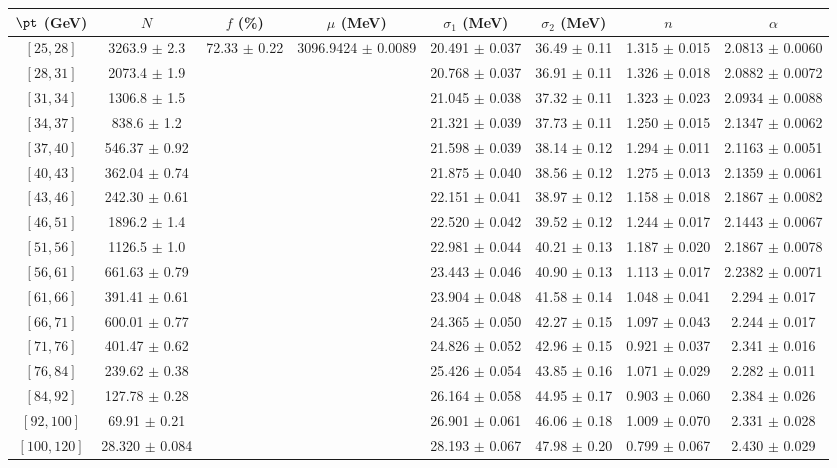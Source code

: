 \begin{tabular}{c||c|c|c|c|c|c|c}
$\pt$ (GeV) & $N$ & $f$ (\%) & $\mu$ (MeV) & $\sigma_1$ (MeV) & $\sigma_2$ (MeV) & $n$ & $\alpha$ \\
\hline
$[25, 28]$ & 3263.9 $\pm$ 2.3 & \multirow{17}{*}{72.33 $\pm$ 0.22} & \multirow{17}{*}{3096.9424 $\pm$ 0.0089} & 20.491 $\pm$ 0.037 & 36.49 $\pm$ 0.11 & 1.315 $\pm$ 0.015 & 2.0813 $\pm$ 0.0060\\
$[28, 31]$ & 2073.4 $\pm$ 1.9 &  &  & 20.768 $\pm$ 0.037 & 36.91 $\pm$ 0.11 & 1.326 $\pm$ 0.018 & 2.0882 $\pm$ 0.0072\\
$[31, 34]$ & 1306.8 $\pm$ 1.5 &  &  & 21.045 $\pm$ 0.038 & 37.32 $\pm$ 0.11 & 1.323 $\pm$ 0.023 & 2.0934 $\pm$ 0.0088\\
$[34, 37]$ & 838.6 $\pm$ 1.2 &  &  & 21.321 $\pm$ 0.039 & 37.73 $\pm$ 0.11 & 1.250 $\pm$ 0.015 & 2.1347 $\pm$ 0.0062\\
$[37, 40]$ & 546.37 $\pm$ 0.92 &  &  & 21.598 $\pm$ 0.039 & 38.14 $\pm$ 0.12 & 1.294 $\pm$ 0.011 & 2.1163 $\pm$ 0.0051\\
$[40, 43]$ & 362.04 $\pm$ 0.74 &  &  & 21.875 $\pm$ 0.040 & 38.56 $\pm$ 0.12 & 1.275 $\pm$ 0.013 & 2.1359 $\pm$ 0.0061\\
$[43, 46]$ & 242.30 $\pm$ 0.61 &  &  & 22.151 $\pm$ 0.041 & 38.97 $\pm$ 0.12 & 1.158 $\pm$ 0.018 & 2.1867 $\pm$ 0.0082\\
$[46, 51]$ & 1896.2 $\pm$ 1.4 &  &  & 22.520 $\pm$ 0.042 & 39.52 $\pm$ 0.12 & 1.244 $\pm$ 0.017 & 2.1443 $\pm$ 0.0067\\
$[51, 56]$ & 1126.5 $\pm$ 1.0 &  &  & 22.981 $\pm$ 0.044 & 40.21 $\pm$ 0.13 & 1.187 $\pm$ 0.020 & 2.1867 $\pm$ 0.0078\\
$[56, 61]$ & 661.63 $\pm$ 0.79 &  &  & 23.443 $\pm$ 0.046 & 40.90 $\pm$ 0.13 & 1.113 $\pm$ 0.017 & 2.2382 $\pm$ 0.0071\\
$[61, 66]$ & 391.41 $\pm$ 0.61 &  &  & 23.904 $\pm$ 0.048 & 41.58 $\pm$ 0.14 & 1.048 $\pm$ 0.041 & 2.294 $\pm$ 0.017\\
$[66, 71]$ & 600.01 $\pm$ 0.77 &  &  & 24.365 $\pm$ 0.050 & 42.27 $\pm$ 0.15 & 1.097 $\pm$ 0.043 & 2.244 $\pm$ 0.017\\
$[71, 76]$ & 401.47 $\pm$ 0.62 &  &  & 24.826 $\pm$ 0.052 & 42.96 $\pm$ 0.15 & 0.921 $\pm$ 0.037 & 2.341 $\pm$ 0.016\\
$[76, 84]$ & 239.62 $\pm$ 0.38 &  &  & 25.426 $\pm$ 0.054 & 43.85 $\pm$ 0.16 & 1.071 $\pm$ 0.029 & 2.282 $\pm$ 0.011\\
$[84, 92]$ & 127.78 $\pm$ 0.28 &  &  & 26.164 $\pm$ 0.058 & 44.95 $\pm$ 0.17 & 0.903 $\pm$ 0.060 & 2.384 $\pm$ 0.026\\
$[92, 100]$ & 69.91 $\pm$ 0.21 &  &  & 26.901 $\pm$ 0.061 & 46.06 $\pm$ 0.18 & 1.009 $\pm$ 0.070 & 2.331 $\pm$ 0.028\\
$[100, 120]$ & 28.320 $\pm$ 0.084 &  &  & 28.193 $\pm$ 0.067 & 47.98 $\pm$ 0.20 & 0.799 $\pm$ 0.067 & 2.430 $\pm$ 0.029\\
\end{tabular}
